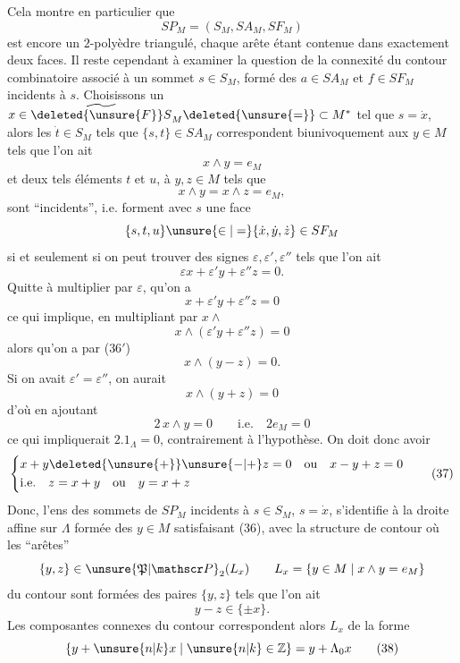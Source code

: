 Cela montre en particulier que
\[
SP_M=(S_M,SA_M,SF_M)\tag*{(35)}
\]
est encore un $2$-polyèdre triangulé, chaque arête étant contenue dans exactement deux faces. Il reste cependant à examiner la question de la connexité du contour combinatoire  associé
à un sommet $s\in S_M$, formé des $a\in SA_M$ et $f\in SF_M$ incidents à $s$. Choisissons un $x\in\widetilde{\deleted{\unsure{F}}S}_M\deleted{\unsure{=}}\subset M^*$ tel que $s=\dot x$, alors les $\dot t\in S_M$ tels que $\{s,t\}\in SA_M$ correspondent biunivoquement aux $y\in M$ tels que l'on ait
\[
x\wedge y=e_M\tag*{(35)}
\]
et deux tels éléments $t$ et $u$,  à $y,z\in M$ tels que
\[
x\wedge y=x\wedge z=e_M,\tag*{($36'$)}
\]
sont ``incidents'', i.e. forment avec $s$ une face
\[
\{s,t,u\}\unsure{\in|=}\{\dot x,\dot y,\dot z\}\in SF_M
\]
si et seulement si on peut trouver des signes $\varepsilon,\varepsilon',\varepsilon''$ tels que l'on ait
\[
\varepsilon x+\varepsilon'y+\varepsilon''z=0.
\]
Quitte à multiplier par $\varepsilon$,  qu'on a
\[
x+\varepsilon'y+\varepsilon''z=0
\]
ce qui implique, en multipliant par $x\wedge$
\[
x\wedge(\varepsilon'y+\varepsilon''z)=0
\]
alors qu'on a par ($36'$)
\[
x\wedge(y-z)=0.
\]
Si on avait $\varepsilon'=\varepsilon''$, on aurait  
\[
x\wedge(y+z)=0
\]
d'où en ajoutant
\[
2\,x\wedge y=0\qquad\text{i.e.}\quad 2e_M=0
\]
ce qui impliquerait $2.1_\Lambda=0$, contrairement à l'hypothèse. On doit donc avoir
\[
\left\{\begin{aligned}
&x+y\deleted{\unsure{+}}\unsure{-|+}z=0\quad\text{ou}\quad x-y+z=0\\
&\text{i.e.}\quad z=x+y\quad\text{ou}\quad y=x+z
\end{aligned}\right.\tag*{(37)}
\]
Donc, l'ens des sommets de $SP_M$ incidents à $s\in S_M$, $s=\dot x$, s'identifie à la droite affine  sur $\Lambda$ formée des $y\in M$ satisfaisant (36), avec la structure de contour où les ``arêtes''
\[
\{y,z\}\in\unsure{\mathfrak P|\mathscr P}_2(L_x)\qquad L_x=\{y\in M\mid x\wedge y=e_M\}
\]
 du contour sont formées des paires $\{y,z\}$ tels que l'on ait
\[
y-z\in\{\pm x\}.
\]
Les composantes connexes du contour correspondent  alors    $L_x$ de la forme
\[
\{y+\unsure{n|k}x\mid \unsure{n|k}\in\mathbb{Z}\}=y+\Lambda_0 x\tag*{(38)}
\]
